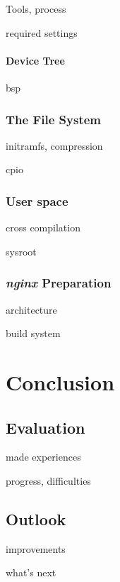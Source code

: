 Tools, process

required settings

\subsubsection{Device Tree}

bsp



\subsection{The File System}

initramfs, compression

cpio

\subsection{User space}

cross compilation

sysroot

\subsection{\textit{nginx} Preparation}

architecture

build system

\chapter{Conclusion}

\section{Evaluation}

made experiences

progress, difficulties

\section{Outlook}

improvements

what's next
